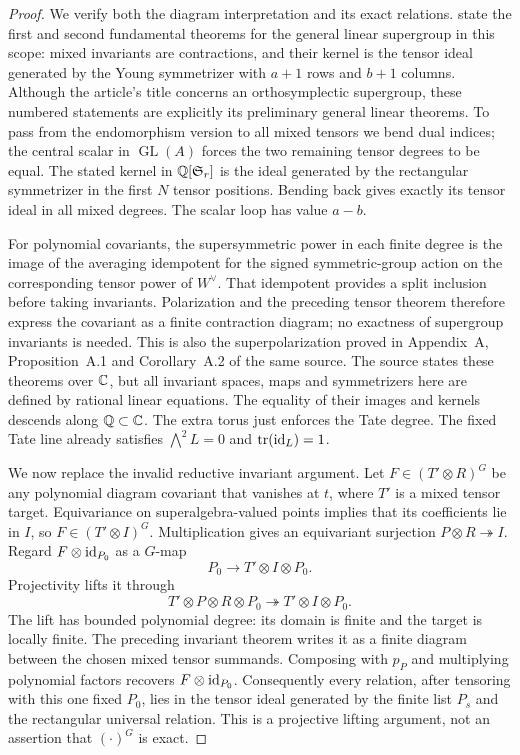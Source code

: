\begin{proof}
We verify both the diagram interpretation and its exact relations.
\citet[Theorem~2.1, Corollary~2.2, Theorem~2.3 and
Corollary~2.5]{c_lehrerzhang2021super} state the first and second
fundamental theorems for the general linear supergroup in this
scope: mixed invariants are contractions, and their kernel is the
tensor ideal generated by the Young symmetrizer with $a+1$ rows
and $b+1$ columns.  Although the article's title concerns an
orthosymplectic supergroup, these numbered statements are explicitly
its preliminary general linear theorems.  To pass from the
endomorphism version to all mixed tensors we bend dual indices;
the central scalar in $\operatorname{GL}(A)$ forces the two
remaining tensor degrees to be equal.  The stated kernel in
$\mathbb Q[\mathfrak S_r]$ is the ideal generated by the rectangular
symmetrizer in the first $N$ tensor positions.  Bending back gives
exactly its tensor ideal in all mixed degrees.  The scalar loop
has value $a-b$.

For polynomial covariants, the supersymmetric power in each finite
degree is the image of the averaging idempotent for the signed
symmetric-group action on the corresponding tensor power of
$W^\vee$.  That idempotent provides a split inclusion before taking
invariants.  Polarization and the preceding tensor theorem
therefore express the covariant as a finite contraction diagram;
no exactness of supergroup invariants is needed.  This is also the
superpolarization proved in Appendix~A, Proposition~A.1 and
Corollary~A.2 of the same source.  The source states these theorems
over $\mathbb C$, but all invariant spaces, maps and symmetrizers here
are defined by rational linear equations.  The equality of their
images and kernels descends along $\mathbb Q\subset\mathbb C$.
The extra torus just enforces the Tate degree.  The fixed Tate
line already satisfies $\bigwedge^2L=0$ and
$\operatorname{tr}(\operatorname{id}_L)=1$.

We now replace the invalid reductive invariant argument.  Let
$F\in(T'\otimes R)^G$ be any polynomial diagram covariant that
vanishes at $t$, where $T'$ is a mixed tensor target.  Equivariance
on superalgebra-valued points implies that its coefficients lie
in $I$, so $F\in(T'\otimes I)^G$.  Multiplication gives an
equivariant surjection $P\otimes R\twoheadrightarrow I$.
Regard $F\otimes\operatorname{id}_{P_0}$ as a $G$-map
\[
 P_0\longrightarrow T'\otimes I\otimes P_0.
\]
Projectivity lifts it through
\[
 T'\otimes P\otimes R\otimes P_0
     \twoheadrightarrow T'\otimes I\otimes P_0.
\]
The lift has bounded polynomial degree: its domain is finite and
the target is locally finite.  The preceding invariant theorem
writes it as a finite diagram between the chosen mixed tensor
summands.  Composing with $p_P$ and multiplying polynomial factors
recovers $F\otimes\operatorname{id}_{P_0}$.  Consequently every relation,
after tensoring with this one fixed $P_0$, lies in the tensor ideal
generated by the finite list $P_s$ and the rectangular universal
relation.  This is a projective lifting argument, not an assertion
that $(\cdot)^G$ is exact.


\end{proof}
